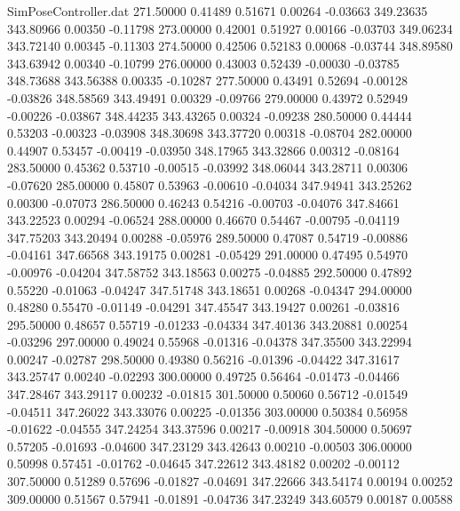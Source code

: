 \begin{filecontents}{SimPoseController.dat}
 271.50000    0.41489    0.51671     0.00264   -0.03663  349.23635  343.80966    0.00350   -0.11798
 273.00000    0.42001    0.51927     0.00166   -0.03703  349.06234  343.72140    0.00345   -0.11303
 274.50000    0.42506    0.52183     0.00068   -0.03744  348.89580  343.63942    0.00340   -0.10799
 276.00000    0.43003    0.52439    -0.00030   -0.03785  348.73688  343.56388    0.00335   -0.10287
 277.50000    0.43491    0.52694    -0.00128   -0.03826  348.58569  343.49491    0.00329   -0.09766
 279.00000    0.43972    0.52949    -0.00226   -0.03867  348.44235  343.43265    0.00324   -0.09238
 280.50000    0.44444    0.53203    -0.00323   -0.03908  348.30698  343.37720    0.00318   -0.08704
 282.00000    0.44907    0.53457    -0.00419   -0.03950  348.17965  343.32866    0.00312   -0.08164
 283.50000    0.45362    0.53710    -0.00515   -0.03992  348.06044  343.28711    0.00306   -0.07620
 285.00000    0.45807    0.53963    -0.00610   -0.04034  347.94941  343.25262    0.00300   -0.07073
 286.50000    0.46243    0.54216    -0.00703   -0.04076  347.84661  343.22523    0.00294   -0.06524
 288.00000    0.46670    0.54467    -0.00795   -0.04119  347.75203  343.20494    0.00288   -0.05976
 289.50000    0.47087    0.54719    -0.00886   -0.04161  347.66568  343.19175    0.00281   -0.05429
 291.00000    0.47495    0.54970    -0.00976   -0.04204  347.58752  343.18563    0.00275   -0.04885
 292.50000    0.47892    0.55220    -0.01063   -0.04247  347.51748  343.18651    0.00268   -0.04347
 294.00000    0.48280    0.55470    -0.01149   -0.04291  347.45547  343.19427    0.00261   -0.03816
 295.50000    0.48657    0.55719    -0.01233   -0.04334  347.40136  343.20881    0.00254   -0.03296
 297.00000    0.49024    0.55968    -0.01316   -0.04378  347.35500  343.22994    0.00247   -0.02787
 298.50000    0.49380    0.56216    -0.01396   -0.04422  347.31617  343.25747    0.00240   -0.02293
 300.00000    0.49725    0.56464    -0.01473   -0.04466  347.28467  343.29117    0.00232   -0.01815
 301.50000    0.50060    0.56712    -0.01549   -0.04511  347.26022  343.33076    0.00225   -0.01356
 303.00000    0.50384    0.56958    -0.01622   -0.04555  347.24254  343.37596    0.00217   -0.00918
 304.50000    0.50697    0.57205    -0.01693   -0.04600  347.23129  343.42643    0.00210   -0.00503
 306.00000    0.50998    0.57451    -0.01762   -0.04645  347.22612  343.48182    0.00202   -0.00112
 307.50000    0.51289    0.57696    -0.01827   -0.04691  347.22666  343.54174    0.00194    0.00252
 309.00000    0.51567    0.57941    -0.01891   -0.04736  347.23249  343.60579    0.00187    0.00588

\end{filecontents}
